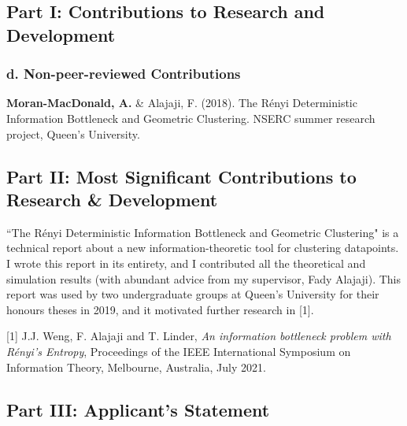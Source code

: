\documentclass[a4paper,12pt]{article}
\begin{document}
\subsection*{Part I: Contributions to Research and Development}
\subsubsection*{d. Non-peer-reviewed Contributions}
\textbf{Moran-MacDonald, A.} \& Alajaji, F. (2018). The R\'{e}nyi Deterministic
Information Bottleneck and Geometric Clustering. NSERC summer research project,
Queen's University.

\subsection*{Part II: Most Significant Contributions to Research \& Development}
``The R\'{e}nyi Deterministic Information Bottleneck and Geometric
Clustering" is a technical report about a new information-theoretic tool for
clustering datapoints.
I wrote this report in its entirety, and I contributed all the theoretical and
simulation results (with abundant advice from my supervisor, Fady Alajaji).
This report was used by two undergraduate groups at Queen's University for their
honours theses in 2019, and it motivated further research in [1].

[1] J.J. Weng, F. Alajaji and T. Linder, \textit{An information bottleneck
problem with R\'{e}nyi's Entropy}, Proceedings of the IEEE International
Symposium on Information Theory, Melbourne, Australia, July 2021.

\subsection*{Part III: Applicant's Statement}
\end{document}
